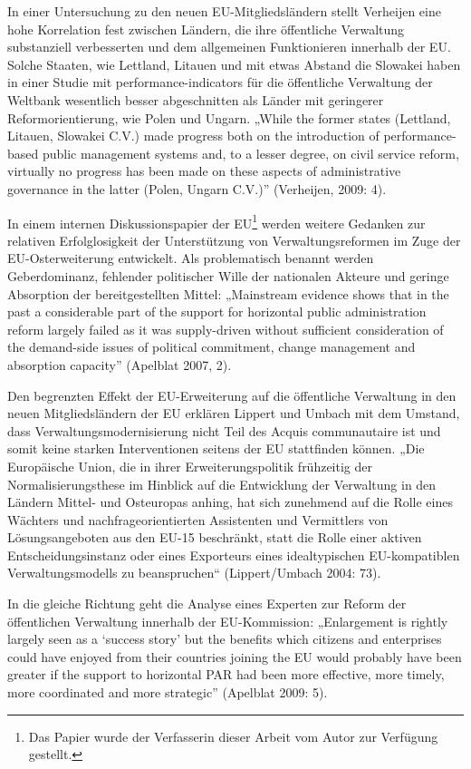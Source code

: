 In einer Untersuchung zu den neuen EU-Mitgliedsländern stellt Verheijen eine hohe Korrelation fest zwischen Ländern, die ihre öffentliche Verwaltung substanziell verbesserten und dem allgemeinen Funktionieren innerhalb der EU. Solche Staaten, wie Lettland, Litauen und mit etwas Abstand die Slowakei haben in einer Studie mit performance-indicators für die öffentliche Verwaltung der Weltbank wesentlich besser abgeschnitten als Länder mit geringerer Reformorientierung, wie Polen und Ungarn. „While the former states (Lettland, Litauen, Slowakei C.V.) made progress both on the introduction of performance-based public management systems and, to a lesser degree, on civil service reform, virtually no progress has been made on these aspects of administrative governance in the latter (Polen, Ungarn C.V.)” (Verheijen, 2009: 4).\par
In einem internen Diskussionspapier der EU\footnote{Das Papier wurde der Verfasserin dieser Arbeit vom Autor zur Verfügung gestellt.} werden weitere Gedanken zur relativen Erfolglosigkeit der Unterstützung von Verwaltungsreformen im Zuge der EU-Osterweiterung entwickelt. Als problematisch benannt werden Geberdominanz, fehlender politischer Wille der nationalen Akteure und geringe Absorption der bereitgestellten Mittel: „Mainstream evidence shows that in the past a considerable part of the support for horizontal public administration reform largely failed as it was supply-driven without sufficient consideration of the demand-side issues of political commitment, change management and absorption capacity” (Apelblat 2007, 2). \par
Den begrenzten Effekt der EU-Erweiterung auf die öffentliche Verwaltung in den neuen Mitgliedsländern der EU erklären Lippert und Umbach mit dem Umstand, dass Verwaltungsmodernisierung nicht Teil des Acquis communautaire ist und somit keine starken Interventionen seitens der EU stattfinden können. „Die Europäische Union, die in ihrer Erweiterungspolitik frühzeitig der Normalisierungsthese im Hinblick auf die Entwicklung der Verwaltung in den Ländern Mittel- und Osteuropas anhing, hat sich zunehmend auf die Rolle eines Wächters und nachfrageorientierten Assistenten und Vermittlers von Lösungsangeboten aus den EU-15 beschränkt, statt die Rolle einer aktiven Entscheidungsinstanz oder eines Exporteurs eines idealtypischen EU-kompatiblen Verwaltungsmodells zu beanspruchen“ (Lippert/Umbach 2004: 73).
\par
In die gleiche Richtung geht die Analyse eines Experten zur Reform der öffentlichen Verwaltung innerhalb der EU-Kommission: „Enlargement is rightly largely seen as a ‘success story’ but the benefits which citizens and enterprises could have enjoyed from their countries joining the EU would probably have been greater if the support to horizontal PAR had been more effective, more timely, more coordinated and more strategic” (Apelblat 2009: 5).\par
